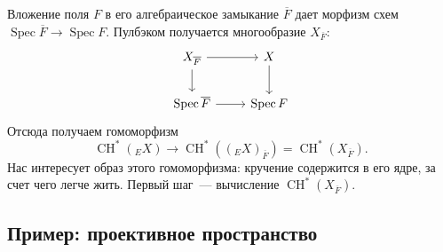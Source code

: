 \documentclass[a4paper]{article}
\DeclareMathOperator{\Spec}{Spec}
\DeclareMathOperator{\CH}{CH}
\theoremstyle{definition}
\newcommand{\ol}{\overline}
\begin{document}
Вложение поля $F$ в его алгебраическое замыкание $\ol{F}$ дает морфизм
схем $\Spec\ol{F} \to \Spec F$.
Пулбэком получается многообразие $X_{\ol{F}}$:
\[
\begin{tikzcd}
X_{\ol{F}} \arrow{r} \arrow{d} & X \arrow{d} \\
\Spec\ol{F} \arrow{r} & \Spec F
\end{tikzcd}
\]
Отсюда получаем гомоморфизм
\[
\CH^*({}_{E}X) \to \CH^*(({}_{E}X)_{\ol{F}}) = \CH^*(X_{\ol{F}}).
\]
Нас интересует образ этого гомоморфизма: кручение содержится в его ядре,
за счет чего легче жить.
Первый шаг~--- вычисление $\CH^*(X_{\ol{F}})$.

\subsection{Пример: проективное пространство}\label{ssect:chow-ring-of-pn}
\end{document}
